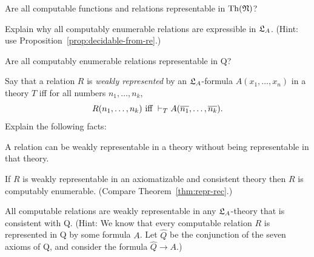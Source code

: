 
\fi

\begin{exercise}
  Are all computable functions and relations representable in
  $\mathrm{Th}(\mathfrak{N})$?
\end{exercise}

\begin{exercise}
  Explain why all computably enumerable relations are expressible in $\mathfrak{L}_{A}$.
  (Hint: use Proposition~\ref{prop:decidable-from-re}.) 
\end{exercise}

\begin{exercise}
  Are all computably enumerable relations representable in Q?
\end{exercise}

\begin{exercise}\label{ex:weak-repr}
  Say that a relation $R$ is \emph{weakly represented} by an $\mathfrak{L}_{A}$-formula $A(x_{1},\ldots,x_{n})$ in a theory $T$ iff for all numbers $n_{1},\ldots,n_{k}$,
  \[
    R(n_{1},\ldots,n_{k}) \text{ iff } \vdash_{T} A(\overline{n_{1}},\ldots,\overline{n_{k}}).
  \]
  Explain the following facts:
  \begin{cenumerate}
    \item[(a)] A relation can be weakly representable in a theory without being representable in that theory.
    \item[(b)] If $R$ is weakly representable in an axiomatizable and consistent theory
    then $R$ is computably enumerable. (Compare Theorem~\ref{thm:repr-rec}.)
    \item[(c)] All computable relations are weakly representable in any $\mathfrak{L}_{A}$-theory that is   consistent with Q.
    (Hint:
    We know that every computable relation $R$ is represented in Q by some formula $A$.
    Let $\hat{Q}$ be the conjunction of the seven axioms of Q,
    and consider the formula $\hat{Q} \to A$.)
  \end{cenumerate}
\end{exercise}



